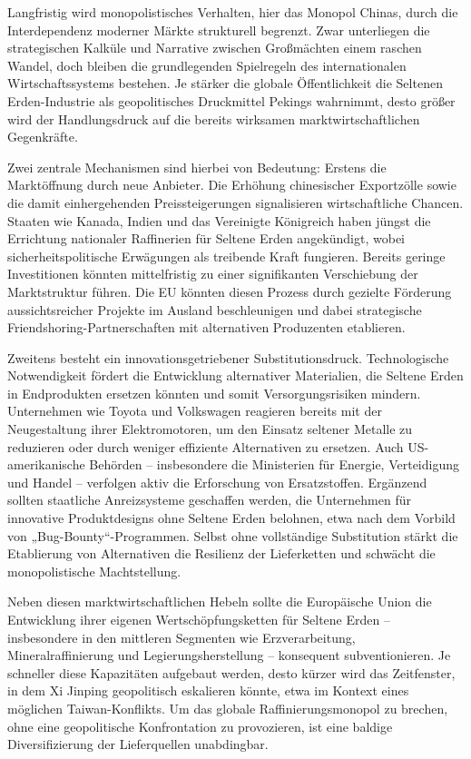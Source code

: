 \documentclass[12pt,a4paper,oneside]{book} %
\begin{document}
Langfristig wird monopolistisches Verhalten, hier das Monopol Chinas, durch die Interdependenz moderner Märkte strukturell begrenzt. Zwar unterliegen die strategischen Kalküle und Narrative zwischen Großmächten einem raschen Wandel, doch bleiben die grundlegenden Spielregeln des internationalen Wirtschaftssystems bestehen. Je stärker die globale Öffentlichkeit die Seltenen Erden-Industrie als geopolitisches Druckmittel Pekings wahrnimmt, desto größer wird der Handlungsdruck auf die bereits wirksamen marktwirtschaftlichen Gegenkräfte.

Zwei zentrale Mechanismen sind hierbei von Bedeutung: Erstens die Marktöffnung durch neue Anbieter. Die Erhöhung chinesischer Exportzölle sowie die damit einhergehenden Preissteigerungen signalisieren wirtschaftliche Chancen. Staaten wie Kanada, Indien und das Vereinigte Königreich haben jüngst die Errichtung nationaler Raffinerien für Seltene Erden angekündigt, wobei sicherheitspolitische Erwägungen als treibende Kraft fungieren. Bereits geringe Investitionen könnten mittelfristig zu einer signifikanten Verschiebung der Marktstruktur führen. Die EU könnten diesen Prozess durch gezielte Förderung aussichtsreicher Projekte im Ausland beschleunigen und dabei strategische Friendshoring-Partnerschaften mit alternativen Produzenten etablieren.

Zweitens besteht ein innovationsgetriebener Substitutionsdruck. Technologische Notwendigkeit fördert die Entwicklung alternativer Materialien, die Seltene Erden in Endprodukten ersetzen könnten und somit Versorgungsrisiken mindern. Unternehmen wie Toyota und Volkswagen reagieren bereits mit der Neugestaltung ihrer Elektromotoren, um den Einsatz seltener Metalle zu reduzieren oder durch weniger effiziente Alternativen zu ersetzen. Auch US-amerikanische Behörden – insbesondere die Ministerien für Energie, Verteidigung und Handel – verfolgen aktiv die Erforschung von Ersatzstoffen. Ergänzend sollten staatliche Anreizsysteme geschaffen werden, die Unternehmen für innovative Produktdesigns ohne Seltene Erden belohnen, etwa nach dem Vorbild von „Bug-Bounty“-Programmen. Selbst ohne vollständige Substitution stärkt die Etablierung von Alternativen die Resilienz der Lieferketten und schwächt die monopolistische Machtstellung.

Neben diesen marktwirtschaftlichen Hebeln sollte die Europäische Union die Entwicklung ihrer eigenen Wertschöpfungsketten für Seltene Erden – insbesondere in den mittleren Segmenten wie Erzverarbeitung, Mineralraffinierung und Legierungsherstellung – konsequent subventionieren. Je schneller diese Kapazitäten aufgebaut werden, desto kürzer wird das Zeitfenster, in dem Xi Jinping geopolitisch eskalieren könnte, etwa im Kontext eines möglichen Taiwan-Konflikts. Um das globale Raffinierungsmonopol zu brechen, ohne eine geopolitische Konfrontation zu provozieren, ist eine baldige Diversifizierung der Lieferquellen unabdingbar.
\end{document}

